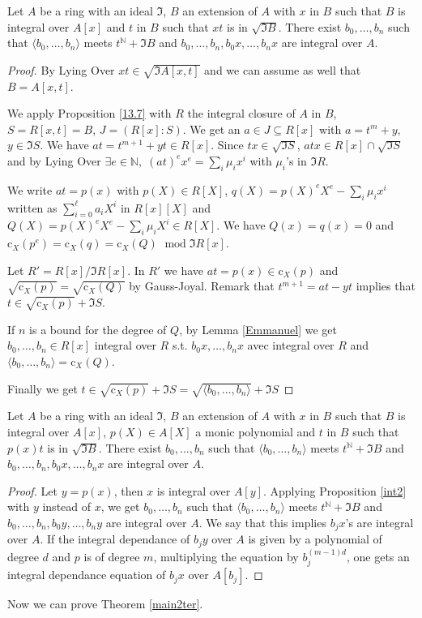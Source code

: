 \documentclass[11pt,a4paper,twoside]{article}
\newcommand \NN{\mathbb{N}}
\newcommand{\gothic}{\mathfrak}
\newcommand{\fI}{{\gothic I}}
\newcommand\gen[1]{{\langle #1 \rangle}}
\newcommand{\mod}{\;\mathrm{mod}\;}
\newcommand{\rc}{\mathrm{c}}
\begin{document}
\begin{proposition}\label{int2}
Let $A$ be a ring with an ideal $\fI$, $B$  an extension of $A$
with $x$ in $B$ such that $B$ is integral over $A[x]$ and $t$ in $B$
such that $xt$ is in $\sqrt{\fI B}$. There exist $b_0,\dots,b_n$
such that $\gen{b_0,\dots,b_n}$ meets
$t^{\NN} + \fI B$ and $b_0,\dots,b_n,b_0x,\dots,b_nx$ are integral
over $A$.
\end{proposition}
%
\begin{proof}
By Lying Over $xt\in\sqrt{\fI A[x,t]}$ and we can assume as well that $B=A[x,t]$. 

\noindent We apply Proposition \ref{13.7}
with   $R$ the integral closure of $A$ in $B$, $S=R[x,t]=B$, $J=(R[x]:S)$. 
We get an $a\in J\subseteq R[x]$
with $a=t^m+y$, $y\in \fI S$. We have $at=t^{m+1}+y t\in R[x]$.
Since $tx\in \sqrt{\fI S}$, $atx\in R[x]\cap\sqrt{\fI S}$ and by Lying Over
 $\exists e\in\NN,\;(at)^{e}  x^{e}=\sum_i\mu_i x ^{i}$ with $\mu_i$'s 
 in $\fI R$. 
 
\noindent We write $at=p(x)$ with $p(X)\in R[X]$, $q(X)=p(X)^{e}X^{e}-\sum_{i}\mu_i x ^{i}$ written as $\sum_{i=0}^{\ell}a_iX^{i}$ in $R[x][X]$ and $Q(X)=p(X)^{e}X^{e}-\sum_{i}\mu_i X ^{i}\in R[X]$. We have $Q(x)=q(x)=0$ and $\rc_X(p^{e})=\rc_X(q)=\rc_X(Q)
$ $\mod\fI R[x]$. 
 
\noindent Let $R'=R[x]/\fI R[x]$. In $R'$ we have $at=p(x)\in\rc_X(p)$
 and $\sqrt{\rc_X(p)}=\sqrt{\rc_X(Q)}$ by Gauss-Joyal.
 Remark that $t^{m+1}=at-yt$ implies that $t\in\sqrt{\rc_X(p)}+\fI S$.



\noindent If $n$ is a bound for the degree of $Q$, by Lemma \ref{Emmanuel} we get  $b_0,\dots,b_n\in R[x]$ integral over $R$ s.t.
$b_0x,\dots,b_nx$ avec integral over $R$ and $\gen{b_0,\dots,b_n}=\rc_X(Q)$.


\noindent Finally we get $t\in \sqrt{\rc_X(p)}+\fI S=\sqrt{\gen{b_0,\dots,b_n}}+\fI S$
\end{proof}
%

\begin{corollary} \label{corint2}
Let $A$ be a ring with an ideal $\fI$, $B$  an extension of $A$
with $x$ in $B$ such that $B$ is integral over $A[x]$,
$p(X)\in A[X]$ a monic polynomial and $t$ in $B$
such that $p(x)t$ is in $\sqrt{\fI B}$. There exist $b_0,\dots,b_n$
such that $\gen{b_0,\dots,b_n}$ meets
$t^{\NN} + \fI B$ and $b_0,\dots,b_n,b_0x,\dots,b_nx$ are integral
over $A$. 
\end{corollary}
%
\begin{proof}
Let $y=p(x)$, then $x$ is integral over $A[y]$.
Applying Proposition \ref{int2} with $y$ instead of $x$,
we get $b_0,\dots,b_n$
such that $\gen{b_0,\dots,b_n}$ meets
$t^{\NN} + \fI B$ and $b_0,\dots,b_n,b_0y,\dots,b_ny$ are integral
over $A$. We say that this implies $b_jx$'s are integral over $A$.
If the integral dependance of $b_jy$ over $A$ is given by a polynomial of
degree $d$ and $p$ is of degree $m$, multiplying the equation by
$b_j^{(m-1)d}$, one gets an integral dependance equation of $b_jx$
over $A[b_j].$  
\end{proof}
%
Now we can prove Theorem \ref{main2ter}.
\end{document}
